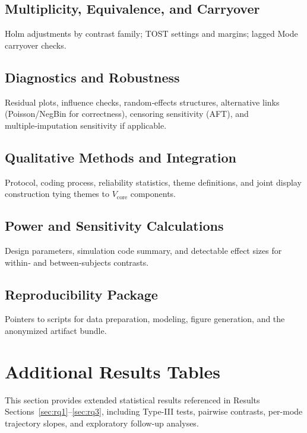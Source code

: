 \documentclass[sigconf]{acmart}
\begin{document}
\subsection{Multiplicity, Equivalence, and Carryover}
\label{app:multiplicity}
Holm adjustments by contrast family; TOST settings and margins; lagged Mode carryover checks.

\subsection{Diagnostics and Robustness}
\label{app:diagnostics}
Residual plots, influence checks, random‑effects structures, alternative links (Poisson/NegBin for correctness), censoring sensitivity (AFT), and multiple‑imputation sensitivity if applicable.

\subsection{Qualitative Methods and Integration}
\label{app:qual}
Protocol, coding process, reliability statistics, theme definitions, and joint display construction tying themes to $V_{\text{core}}$ components.

\subsection{Power and Sensitivity Calculations}
\label{app:power}
Design parameters, simulation code summary, and detectable effect sizes for within‑ and between‑subjects contrasts.

\subsection{Reproducibility Package}
\label{app:repro}
Pointers to scripts for data preparation, modeling, figure generation, and the anonymized artifact bundle.

\section{Additional Results Tables}
\label{app:full-results}

This section provides extended statistical results referenced in Results Sections~\ref{sec:rq1}--\ref{sec:rq3}, including Type-III tests, pairwise contrasts, per-mode trajectory slopes, and exploratory follow-up analyses.
\end{document}
